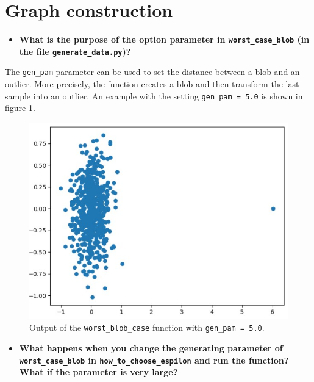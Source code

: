 \documentclass[a4paper, 11pt]{article}
\begin{document}

\maketitle



\section{Graph construction}



\begin{itemize}
    \item[1.1.] \textbf{What is the purpose of the option parameter in \texttt{worst\_case\_blob} (in the file \texttt{generate\_data.py})?}
\end{itemize}

    The \texttt{gen\_pam} parameter can be used to set the distance between a blob and an outlier. More precisely, the function creates a blob and then transform the last sample into an outlier. An example with the setting \texttt{gen\_pam = 5.0} is shown in figure \ref{fig:worst-blob-case}. 
    
    \begin{figure}[!ht]
        \centering
        \includegraphics[width=.5\textwidth]{images/worst_blob_case.jpg}
        \caption{Output of the \texttt{worst\_blob\_case} function with \texttt{gen\_pam = 5.0}.}
        \label{fig:worst-blob-case}
    \end{figure}
    
\begin{itemize}
    \item[1.2.] \textbf{What happens when you change the generating parameter of \texttt{worst\_case\_blob} in \linebreak
    \texttt{how\_to\_choose\_espilon} and run the function? What if the parameter is very large?}
\end{itemize}
    
\end{document}
